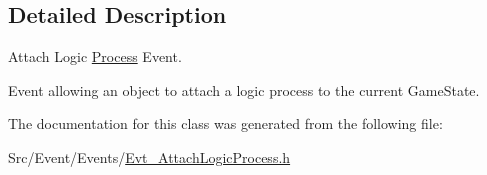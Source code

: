 \subsection{Detailed Description}
Attach Logic \hyperlink{classProcess}{Process} Event. 

Event allowing an object to attach a logic process to the current Game\-State. 

The documentation for this class was generated from the following file\-:\begin{DoxyCompactItemize}
\item 
Src/\-Event/\-Events/\hyperlink{Evt__AttachLogicProcess_8h}{Evt\-\_\-\-Attach\-Logic\-Process.\-h}\end{DoxyCompactItemize}
